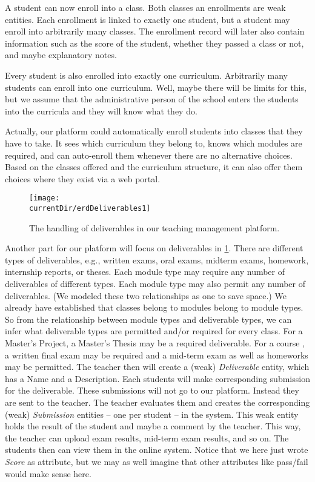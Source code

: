 A student can now enroll into a class.
Both classes an enrollments are weak entities.
Each enrollment is linked to exactly one student, but a student may enroll into arbitrarily many classes.
The enrollment record will later also contain information such as the score of the student, whether they passed a class or not, and maybe explanatory notes.

Every student is also enrolled into exactly one curriculum.
Arbitrarily many students can enroll into one curriculum.
Well, maybe there will be limits for this, but we assume that the administrative person of the school enters the students into the curricula and they will know what they do.

Actually, our platform could automatically enroll students into classes that they have to take.
It sees which curriculum they belong to, knows which modules are required, and can auto-enroll them whenever there are no alternative choices.
Based on the classes offered and the curriculum structure, it can also offer them choices where they exist via a web portal.

\begin{figure}%
\centering%
\texttt{[image: \\currentDir/erdDeliverables1]}%
\caption{The handling of deliverables in our teaching management platform.}%
\label{fig:erdDeliverables1}%
\end{figure}%
%
Another part for our platform will focus on deliverables in \cref{fig:erdDeliverables1}.
There are different types of deliverables, e.g., written exams, oral exams, midterm exams, homework, internship reports, or theses.
Each module type may require any number of deliverables of different types.
Each module type may also permit any number of deliverables.
(We modeled these two relationships as one to save space.)
We already have established that classes belong to modules belong to module types.
So from the relationship between module types and deliverable types, we can infer what deliverable types are permitted and/or required for every class.
For a Master's Project, a Master's Thesis may be a required deliverable.
For a course , a written final exam may be required and a mid-term exam as well as homeworks may be permitted.
The teacher then will create a (weak) \emph{Deliverable} entity, which has a Name and a Description.
Each students will make corresponding submission for the deliverable.
These submissions will not go to our platform.
Instead they are sent to the teacher.
The teacher evaluates them and creates the corresponding (weak) \emph{Submission} entities -- one per student -- in the system.
This weak entity holds the result of the student and maybe a comment by the teacher.
This way, the teacher can upload exam results, mid-term exam results, and so on.
The students then can view them in the online system.
Notice that we here just wrote \emph{Score} as attribute, but we may as well imagine that other attributes like pass/fail would make sense here.

